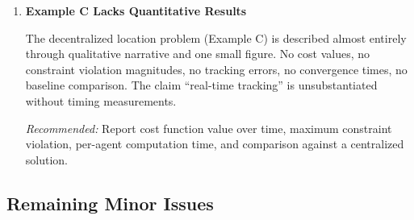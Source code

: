 \documentclass[journal,twoside,web]{ieeecolor}
\begin{document}
\begin{enumerate}[resume]
\textit{Mitigating factor:} Example B is the paper's strongest argument --- the nonlinear uncertainty set genuinely has no known tractable RC, so comparison with RC-based methods is not possible there.

\item \textbf{Example C Lacks Quantitative Results}

The decentralized location problem (Example C) is described almost entirely through qualitative narrative and one small figure. No cost values, no constraint violation magnitudes, no tracking errors, no convergence times, no baseline comparison. The claim ``real-time tracking'' is unsubstantiated without timing measurements.

\textit{Recommended:} Report cost function value over time, maximum constraint violation, per-agent computation time, and comparison against a centralized solution.

\end{enumerate}

\subsection*{Remaining Minor Issues}
\end{document}
